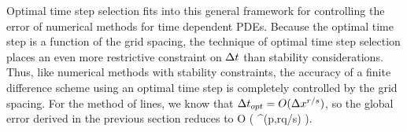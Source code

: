 \documentclass[oneeqnum,onefignum,onetabnum,onethmnum]{siamltex}
\begin{document}
Optimal time step selection fits into this general framework for controlling
the error of numerical methods for time dependent PDEs.  Because the optimal 
time step is a function of the grid spacing, the technique of optimal time 
step selection places an even more restrictive constraint on $\Delta t$ than 
stability considerations.  Thus, like numerical methods with stability 
constraints, the accuracy of a finite difference scheme using an optimal time 
step is completely controlled by the grid spacing.  For the method of lines, 
we know that $\Delta t_{opt} = O(\Delta x^{r/s})$, so the global error derived in the 
previous section reduces to 
\beq
O \left( \dx^{\min(p,rq/s)} \right).
\label{eq:global_error_ots_simplified}
\eeq

\end{document}

